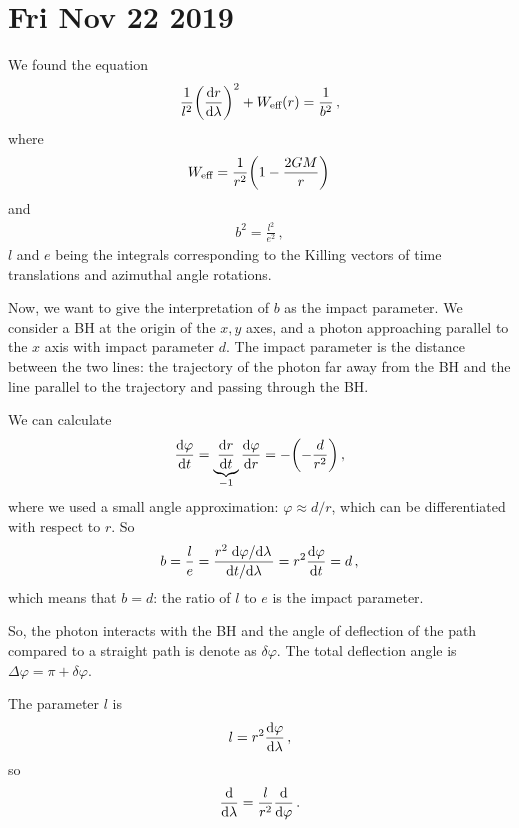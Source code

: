 \documentclass[main.tex]{subfiles}
\begin{document}
\section*{Fri Nov 22 2019}

We found the equation 
%
\begin{align}
  \frac{1}{l^2} \qty(\dv{r}{\lambda })^2 + W _{\text{eff}}(r) = \frac{1}{b^2}
\,,
\end{align}
%
where 
%
\begin{align}
  W _{\text{eff}} = \frac{1}{r^2} \qty(1 - \frac{2GM}{r})
\,
\end{align}
%
and 
%
\begin{align}
  b^2 = \frac{l^2}{e^2}
\,,
\end{align}
%
\(l\) and \(e\) being the integrals corresponding to the Killing vectors of time translations and azimuthal angle rotations. 

Now, we want to give the interpretation of \(b\) as the impact parameter. 
We consider a BH at the origin of the \(x, y\) axes, and a photon approaching parallel to the \(x\) axis with impact parameter \(d\). The impact parameter is the distance between the two lines: the trajectory of the photon far away from the BH and the line parallel to the trajectory and passing through the BH. 

We can calculate 
%
\begin{align}
  \dv{\varphi }{t} = \underbrace{\dv{r}{t}}_{-1} \dv{\varphi }{r} = - \qty(-\frac{d}{r^2})
\,,
\end{align}
%
where we used a small angle approximation: \(\varphi \approx d/r\), which can be differentiated with respect to \(r\). 
So 
%
\begin{align}
  b = \frac{l}{e} = \frac{r^2 \dv*{\varphi }{\lambda }}{\dv*{t}{\lambda }} = r^2 \dv{\varphi }{t} = d 
\,,
\end{align}
%
which means that \(b=d\): the ratio of \(l\) to \(e\) is the impact parameter. 

So, the photon interacts with the BH and the angle of deflection of the path compared to a straight path is denote as \(\delta \varphi \). 
The total deflection angle is \(\Delta \varphi  = \pi + \delta \varphi \). 

The parameter \(l\) is 
%
\begin{align}
  l = r^2 \dv{\varphi }{\lambda } 
\,,
\end{align}
%
so 
%
\begin{align}
  \dv{}{\lambda } = \frac{l}{r^2} \dv{}{\varphi }
\,.
\end{align}
\end{document}
